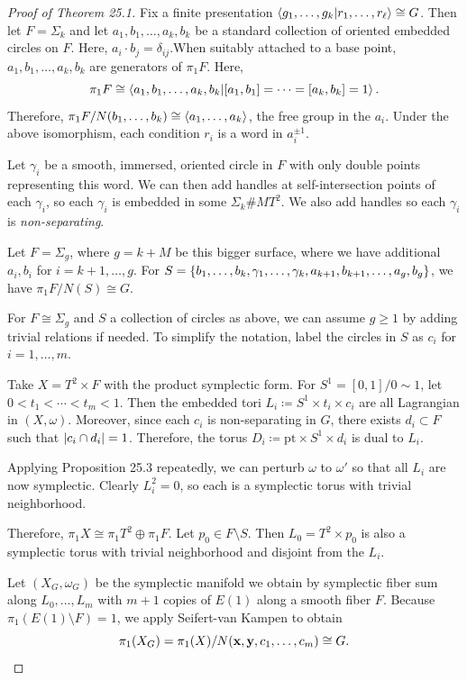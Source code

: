 \documentclass[leqno, openany]{memoir}
\theoremstyle{definition}
\theoremstyle{remark}
\theoremstyle{plain}
\theoremstyle{definition}
\theoremstyle{remark}
\newcommand{\mr}[1]{\mathrm{#1}}
\begin{document}
    \begin{proof}[Proof of Theorem 25.1]
        Fix a finite presentation $\ip{g_1, \ldots, g_k}{r_1, \ldots, r_{\ell}} \cong G$. Then let $F = \Sigma_k$ and let $a_1, b_1, \ldots, a_k, b_k$ be a standard collection of oriented embedded circles on $F$. Here, $a_i \cdot b_j = \delta_{ij}$.When suitably attached to a base point, $a_1, b_1, \ldots, a_k, b_k$ are generators of $\pi_1 F$. Here,
        \[ \pi_1 F \cong \ip{a_1,b_1,\ldots, a_k, b_k}{[a_1,b_1]=\cdots=[a_k,b_k]=1}. \]
        Therefore, $\pi_1 F / N(b_1, \ldots, b_k) \cong \ev{a_1, \ldots, a_k}$, the free group in the $a_i$. Under the above isomorphism, each condition $r_i$ is a word in $a_i^{\pm 1}$. 

        Let $\gamma_i$ be a smooth, immersed, oriented circle in $F$ with only double points representing this word. We can then add handles at self-intersection points of each $\gamma_i$, so each $\gamma_i$ is embedded in some $\Sigma_k \# M T^2$. We also add handles so each $\gamma_i$ is \textit{non-separating}.

        Let $F = \Sigma_g$, where $g = k + M$ be this bigger surface, where we have additional $a_i,b_i$ for $i = k+1, \ldots, g$. For $S = \qty{b_1, \ldots, b_k, \gamma_1, \ldots, \gamma_k, a_{k+1}, b_{k+1}, \ldots, a_g, b_g}$, we have $\pi_1 F / N(S) \cong G$. 

        For $F \cong \Sigma_g$ and $S$ a collection of circles as above, we can assume $g \geq 1$ by adding trivial relations if needed. To simplify the notation, label the circles in $S$ as $c_i$ for $i = 1, \ldots, m$.

        Take $X = T^2 \times F$ with the product symplectic form. For $S^1 = [0,1]/0 \sim 1$, let $0 < t_1 < \cdots < t_m < 1$. Then the embedded tori $L_i \coloneqq S^1 \times t_i \times c_i$ are all Lagrangian in $(X, \omega)$. Moreover, since each $c_i$ is non-separating in $G$, there exists $d_i \subset F$ such that $\abs{c_i \cap d_i} = 1$. Therefore, the torus $D_i \coloneqq \mr{pt} \times S^1 \times d_i$ is dual to $L_i$.

        Applying Proposition 25.3 repeatedly, we can perturb $\omega$ to $\omega'$ so that all $L_i$ are now symplectic. Clearly $L_i^2 = 0$, so each is a symplectic torus with trivial neighborhood.

        Therefore, $\pi_1 X \cong \pi_1 T^2 \oplus \pi_1 F$. Let $p_0 \in F \setminus S$. Then $L_0 = T^2 \times p_0$ is also a symplectic torus with trivial neighborhood and disjoint from the $L_i$.

        Let $(X_G, \omega_G)$ be the symplectic manifold we obtain by symplectic fiber sum along $L_0, \ldots, L_m$ with $m+1$ copies of $E(1)$ along a smooth fiber $F$. Because $\pi_1(E(1) \setminus F) = 1$, we apply Seifert-van Kampen to obtain
        \[ \pi_1(X_G) = \pi_1(X) / N(\mathbf{x}, \mathbf{y}, c_1, \ldots, c_m) \cong G. \qedhere \]
    \end{proof}
\end{document}
